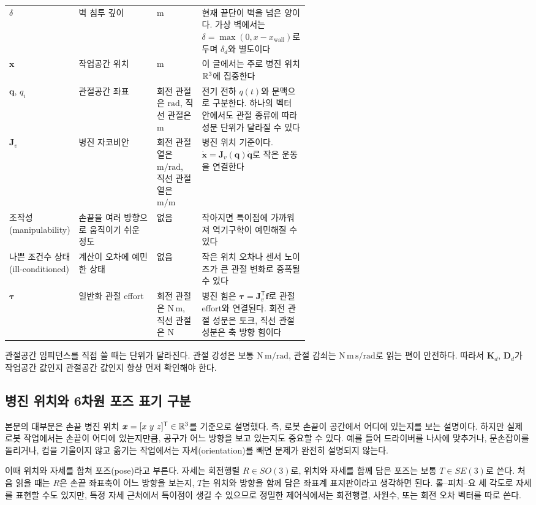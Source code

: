 \begin{table}[H]
\begin{tabularx}{\linewidth}{@{}>{\raggedright\arraybackslash}p{0.16\linewidth}>{\raggedright\arraybackslash}p{0.26\linewidth}>{\raggedright\arraybackslash}p{0.15\linewidth}>{\raggedright\arraybackslash}X@{}}
    $\delta$ & 벽 침투 깊이 & $\mathrm{m}$ & 현재 끝단이 벽을 넘은 양이다. 가상 벽에서는 $\delta=\max(0,x-x_{\mathrm{wall}})$로 두며 $\delta_d$와 별도이다 \\
    $\bm{x}$ & 작업공간 위치 & $\mathrm{m}$ & 이 글에서는 주로 병진 위치 $\mathbb{R}^3$에 집중한다 \\
    $\bm{q}$, $q_i$ & 관절공간 좌표 & 회전 관절은 $\mathrm{rad}$, 직선 관절은 $\mathrm{m}$ & 전기 전하 $q(t)$와 문맥으로 구분한다. 하나의 벡터 안에서도 관절 종류에 따라 성분 단위가 달라질 수 있다 \\
    $\bm{J}_v$ & 병진 자코비안 & 회전 관절 열은 $\mathrm{m/rad}$, 직선 관절 열은 $\mathrm{m/m}$ & 병진 위치 기준이다. $\dot{\bm{x}}=\bm{J}_v(\bm{q})\dot{\bm{q}}$로 작은 운동을 연결한다 \\
    조작성(manipulability) & 손끝을 여러 방향으로 움직이기 쉬운 정도 & 없음 & 작아지면 특이점에 가까워져 역기구학이 예민해질 수 있다 \\
    나쁜 조건수 상태(ill-conditioned) & 계산이 오차에 예민한 상태 & 없음 & 작은 위치 오차나 센서 노이즈가 큰 관절 변화로 증폭될 수 있다 \\
    $\bm{\tau}$ & 일반화 관절 effort & 회전 관절은 $\mathrm{N\,m}$, 직선 관절은 $\mathrm{N}$ & 병진 힘은 $\bm{\tau}=\bm{J}_v^{\mathsf{T}}\bm{f}$로 관절 effort와 연결된다. 회전 관절 성분은 토크, 직선 관절 성분은 축 방향 힘이다 \\
    \bottomrule
  \end{tabularx}
\end{table}

관절공간 임피던스를 직접 쓸 때는 단위가 달라진다.
관절 강성은 보통 $\mathrm{N\,m/rad}$, 관절 감쇠는 $\mathrm{N\,m\,s/rad}$로 읽는 편이 안전하다.
따라서 $\bm{K}_d$, $\bm{D}_d$가 작업공간 값인지 관절공간 값인지 항상 먼저 확인해야 한다.

\subsection{병진 위치와 6차원 포즈 표기 구분}
\label{sec:notation-6d-pose-impedance}

본문의 대부분은 손끝 병진 위치 $\bm{x}=[x\ y\ z]^{\mathsf T}\in\R^3$를 기준으로 설명했다.
즉, 로봇 손끝이 공간에서 어디에 있는지를 보는 설명이다.
하지만 실제 로봇 작업에서는 손끝이 어디에 있는지만큼, 공구가 어느 방향을 보고 있는지도 중요할 수 있다.
예를 들어 드라이버를 나사에 맞추거나, 문손잡이를 돌리거나, 컵을 기울이지 않고 옮기는 작업에서는 자세(orientation)를 빼면 문제가 완전히 설명되지 않는다.

이때 위치와 자세를 합쳐 포즈(pose)라고 부른다.
자세는 회전행렬 $R\in SO(3)$로, 위치와 자세를 함께 담은 포즈는 보통 $T\in SE(3)$로 쓴다.
처음 읽을 때는 $R$은 손끝 좌표축이 어느 방향을 보는지, $T$는 위치와 방향을 함께 담은 좌표계 표지판이라고 생각하면 된다.
롤--피치--요 세 각도로 자세를 표현할 수도 있지만, 특정 자세 근처에서 특이점이 생길 수 있으므로 정밀한 제어식에서는 회전행렬, 사원수, 또는 회전 오차 벡터를 따로 쓴다.

